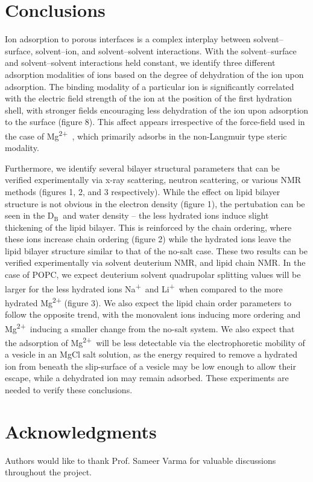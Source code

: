 \documentclass[journal=langd5,manuscript=article]{achemso}
\newcommand{\na}{Na\textsuperscript{+}~}
\newcommand{\li}{Li\textsuperscript{+}~}
\newcommand{\mg}{Mg\textsuperscript{2+}~}
\newcommand{\db}{$\text{D}_\text{B}$}
\begin{document}
\section{Conclusions}
Ion adsorption to porous interfaces is a complex interplay 
between solvent--surface, solvent--ion, and solvent--solvent
interactions. With the solvent--surface and solvent--solvent interactions 
held constant, we identify
three different adsorption modalities of ions based on the degree of 
dehydration of the ion upon adsorption. 
The binding modality of a particular ion is significantly correlated 
with the electric field strength of the ion
at the position of the first hydration shell, with stronger fields 
encouraging less dehydration of the ion upon
adsorption to the surface {(figure 8)}. This affect appears irrespective of the force-field 
used in the case
of \mg, which primarily adsorbs in the non-Langmuir type steric modality.


Furthermore, we identify several bilayer structural
parameters that can be verified experimentally via x-ray scattering, neutron
scattering,
or various NMR methods {(figures 1, 2, and 3 respectively).}
While the effect on lipid bilayer structure is not obvious in
the electron density {(figure 1)}, the pertubation can be seen in the \db~and water density --
the less hydrated ions induce slight thickening of the lipid bilayer. This
is reinforced by the chain ordering, where these ions increase chain ordering {(figure 2)} 
while the hydrated ions leave the lipid bilayer structure similar to that of the no-salt case.
These two results can be verified experimentally via solvent deuterium NMR, and lipid chain NMR.
In the case of POPC, we expect deuterium solvent quadrupolar splitting values will be 
{larger} 
for the less hydrated ions \na and \li when compared to the more hydrated Mg\textsuperscript{2+} {(figure 3)}. 
We also expect the lipid chain order parameters to follow the opposite trend,
with the monovalent ions inducing more ordering and \mg inducing a smaller change from the no-salt system.
We also expect that the adsorption of \mg will be less detectable via the 
electrophoretic mobility of a vesicle in an MgCl salt solution, as
the energy required to remove a hydrated ion from 
beneath the slip-surface of a vesicle may be low enough to allow their escape, while a dehydrated ion may remain
adsorbed.
These experiments are needed to verify
these conclusions. 



\section{Acknowledgments}
Authors would like to thank Prof. Sameer Varma for valuable discussions
throughout the project.
\end{document}
